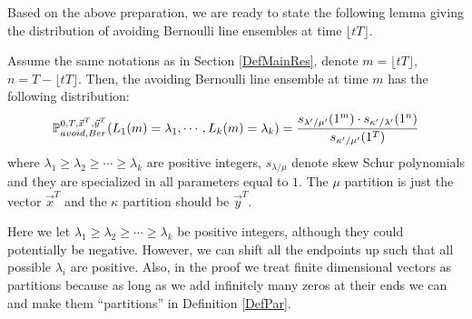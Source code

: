 Based on the above preparation, we are ready to state the following lemma giving the distribution of avoiding Bernoulli line ensembles at time $\lfloor tT \rfloor$.
\begin{lemma}{\label{BerDist}}
Assume the same notations as in Section \ref{DefMainRes}, denote $m=\lfloor tT \rfloor$, $n=T-\lfloor tT \rfloor$. Then, the avoiding Bernoulli line ensemble at time $m$ has the following distribution: 
\begin{align}{\label{ProbMassFunc}}
\mathbb{P}_{avoid, Ber}^{0,T,\vec{x}^{T},\vec{y}^{T}}(L_{1}(m) = \lambda_{1}, \cdots, L_{k}(m) = \lambda_{k})=\frac{s_{\lambda^{\prime}/\mu^{\prime}}(1^{m})\cdot s_{\kappa^{\prime}/\lambda^{\prime}}(1^{n})}{s_{\kappa^{\prime}/\mu^{\prime}}(1^{T})}	
\end{align}
where $\lambda_{1}\geq\lambda_{2}\geq\cdots\geq\lambda_{k}$ are positive integers, $s_{\lambda/\mu}$ denote skew Schur polynomials and they are specialized in all parameters equal to $1$. The $\mu$ partition is just the vector $\vec{x}^{T}$ and the $\kappa$ partition should be $\vec{y}^{T}$.
\end{lemma}
\begin{remark}
	Here we let $\lambda_{1}\geq\lambda_{2}\geq\cdots\geq\lambda_{k}$ be positive integers, although they could potentially be negative. However, we can shift all the endpoints up such that all possible $\lambda_{i}$ are positive. Also, in the proof we treat finite dimensional vectors as partitions because as long as we add infinitely many zeros at their ends we can and make them  ``partitions'' in Definition \ref{DefPar}.
\end{remark}

